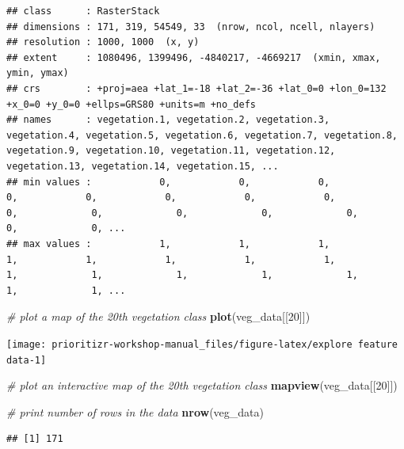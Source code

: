\documentclass[12pt,]{book}
\newenvironment{Shaded}{\begin{snugshade}}{\end{snugshade}}
\newcommand{\KeywordTok}[1]{\textcolor[rgb]{0.13,0.29,0.53}{\textbf{#1}}}
\newcommand{\DecValTok}[1]{\textcolor[rgb]{0.00,0.00,0.81}{#1}}
\newcommand{\CommentTok}[1]{\textcolor[rgb]{0.56,0.35,0.01}{\textit{#1}}}
\newcommand{\NormalTok}[1]{#1}
\begin{document}
\begin{verbatim}
## class      : RasterStack 
## dimensions : 171, 319, 54549, 33  (nrow, ncol, ncell, nlayers)
## resolution : 1000, 1000  (x, y)
## extent     : 1080496, 1399496, -4840217, -4669217  (xmin, xmax, ymin, ymax)
## crs        : +proj=aea +lat_1=-18 +lat_2=-36 +lat_0=0 +lon_0=132 +x_0=0 +y_0=0 +ellps=GRS80 +units=m +no_defs 
## names      : vegetation.1, vegetation.2, vegetation.3, vegetation.4, vegetation.5, vegetation.6, vegetation.7, vegetation.8, vegetation.9, vegetation.10, vegetation.11, vegetation.12, vegetation.13, vegetation.14, vegetation.15, ... 
## min values :            0,            0,            0,            0,            0,            0,            0,            0,            0,             0,             0,             0,             0,             0,             0, ... 
## max values :            1,            1,            1,            1,            1,            1,            1,            1,            1,             1,             1,             1,             1,             1,             1, ...
\end{verbatim}

\begin{Shaded}
\begin{Highlighting}[]
\CommentTok{# plot a map of the 20th vegetation class}
\KeywordTok{plot}\NormalTok{(veg_data[[}\DecValTok{20}\NormalTok{]])}
\end{Highlighting}
\end{Shaded}

\begin{center}\texttt{[image: prioritizr-workshop-manual\_files/figure-latex/explore feature data-1]} \end{center}

\begin{Shaded}
\begin{Highlighting}[]
\CommentTok{# plot an interactive map of the 20th vegetation class}
\KeywordTok{mapview}\NormalTok{(veg_data[[}\DecValTok{20}\NormalTok{]])}
\end{Highlighting}
\end{Shaded}

\begin{Shaded}
\begin{Highlighting}[]
\CommentTok{# print number of rows in the data}
\KeywordTok{nrow}\NormalTok{(veg_data)}
\end{Highlighting}
\end{Shaded}

\begin{verbatim}
## [1] 171
\end{verbatim}
\end{document}

